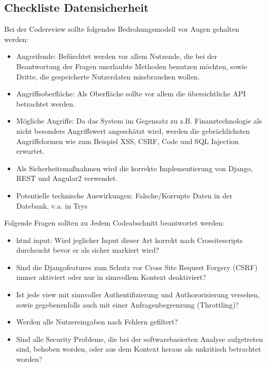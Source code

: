 \subsection{Checkliste Datensicherheit}
\begin{multicols}{2}
Bei der Codereview sollte folgendes Bedrohungsmodell vor Augen gehalten werden:

\begin{itemize}
    \item Angreifende: Befürchtet werden vor allem Nutzende, die bei der Beantwortung der Fragen unerlaubte Methoden benutzen möchten, sowie Dritte, die gespeicherte Nutzerdaten missbrauchen wollen.
    \item Angriffsoberfläche: Als Oberfläche sollte vor allem die übersichtliche API betrachtet werden.
    \item Mögliche Angriffe: Da das System im Gegensatz zu z.B. Finanztechnologie als nicht besonders Angriffswert angeschätzt wird, werden die gebrächlichsten Angriffsformen wie zum Beispiel XSS, CSRF, Code und SQL Injection erwartet.
    \item Als Sicherheitsmaßnahmen wird die korrekte Implementierung von Django, REST und Angular2 verwendet.
    \item Potentielle technische Auswirkungen: Falsche/Korrupte Daten in der Datebank, v.a. in Trys
\end{itemize}

Folgende Fragen sollten zu Jedem Codeabschnitt beantwortet werden:

\begin{itemize}
	\renewcommand{\labelitemi}{\scriptsize$\square$}
    \item html input: Wird jeglicher Input dieser Art korrekt nach Crossitescripts durchsucht bevor er als sicher markiert wird?
    \item Sind die Djangofeatures zum Schutz vor Cross Site Request Forgery (CSRF) immer aktiviert oder nur in sinnvollem Kontext deaktiviert?
    \item Ist jede view mit sinnvoller Authentifizierung und Authororisierung versehen, sowie gegebenenfalls auch mit einer Anfragenbegrenzung (Throttling)?
    \item Werden alle Nutzereingaben nach Fehlern gefiltert?
    \item Sind alle Security Probleme, die bei der softwarebasierten Analyse aufgetreten sind, behoben worden, oder aus dem Kontext heraus als unkritisch betrachtet worden?
\end{itemize}
\end{multicols}
\pagebreak
